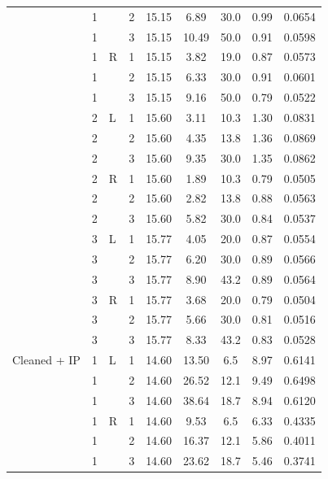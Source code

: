 {\begin{longtable}{lllcccccc}
     & 1 &  & 2 & 15.15 & 6.89 & 30.0 & 0.99 & 0.0654 \\
     & 1 &  & 3 & 15.15 & 10.49 & 50.0 & 0.91 & 0.0598 \\
    \addlinespace[2pt]
     & 1 & R & 1 & 15.15 & 3.82 & 19.0 & 0.87 & 0.0573 \\
     & 1 &  & 2 & 15.15 & 6.33 & 30.0 & 0.91 & 0.0601 \\
     & 1 &  & 3 & 15.15 & 9.16 & 50.0 & 0.79 & 0.0522 \\
    \addlinespace[2pt]
     & 2 & L & 1 & 15.60 & 3.11 & 10.3 & 1.30 & 0.0831 \\
     & 2 &  & 2 & 15.60 & 4.35 & 13.8 & 1.36 & 0.0869 \\
     & 2 &  & 3 & 15.60 & 9.35 & 30.0 & 1.35 & 0.0862 \\
    \addlinespace[2pt]
     & 2 & R & 1 & 15.60 & 1.89 & 10.3 & 0.79 & 0.0505 \\
     & 2 &  & 2 & 15.60 & 2.82 & 13.8 & 0.88 & 0.0563 \\
     & 2 &  & 3 & 15.60 & 5.82 & 30.0 & 0.84 & 0.0537 \\
    \addlinespace[2pt]
     & 3 & L & 1 & 15.77 & 4.05 & 20.0 & 0.87 & 0.0554 \\
     & 3 &  & 2 & 15.77 & 6.20 & 30.0 & 0.89 & 0.0566 \\
     & 3 &  & 3 & 15.77 & 8.90 & 43.2 & 0.89 & 0.0564 \\
    \addlinespace[2pt]
     & 3 & R & 1 & 15.77 & 3.68 & 20.0 & 0.79 & 0.0504 \\
     & 3 &  & 2 & 15.77 & 5.66 & 30.0 & 0.81 & 0.0516 \\
     & 3 &  & 3 & 15.77 & 8.33 & 43.2 & 0.83 & 0.0528 \\
    \midrule
    Cleaned + IP & 1 & L & 1 & 14.60 & 13.50 & 6.5 & 8.97 & 0.6141 \\
     & 1 &  & 2 & 14.60 & 26.52 & 12.1 & 9.49 & 0.6498 \\
     & 1 &  & 3 & 14.60 & 38.64 & 18.7 & 8.94 & 0.6120 \\
    \addlinespace[2pt]
     & 1 & R & 1 & 14.60 & 9.53 & 6.5 & 6.33 & 0.4335 \\
     & 1 &  & 2 & 14.60 & 16.37 & 12.1 & 5.86 & 0.4011 \\
     & 1 &  & 3 & 14.60 & 23.62 & 18.7 & 5.46 & 0.3741 \\
  \bottomrule
\end{longtable}}

